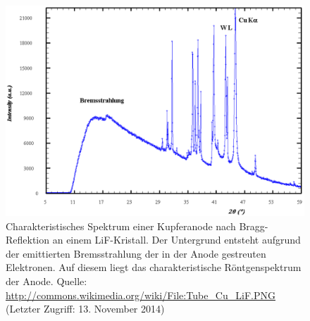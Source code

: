 \documentclass[11pt, a4paper]{article}
\begin{document}
\begin{figure}[h]
  \centering
  \includegraphics[width=1\textwidth]{./grafiken/Tube_Cu_LiF.pdf}
  \caption{Charakteristisches Spektrum einer Kupferanode nach Bragg-Reflektion an einem LiF-Kristall. Der Untergrund entsteht aufgrund der emittierten Bremsstrahlung der in der Anode gestreuten Elektronen. Auf diesem liegt das charakteristische Röntgenspektrum der Anode. Quelle: \url{http://commons.wikimedia.org/wiki/File:Tube_Cu_LiF.PNG} (Letzter Zugriff: 13. November 2014)}
  \label{fig:spektrum}
\end{figure}
\end{document}

